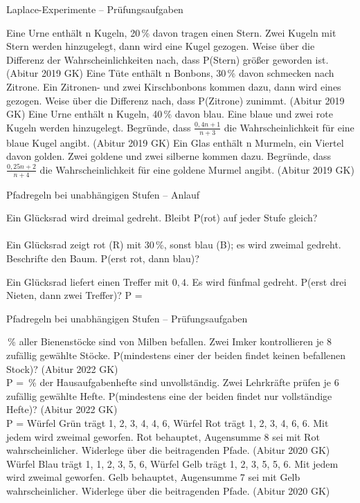 \begin{aufgabe}{Laplace-Experimente – Prüfungsaufgaben}
\begin{teile}
\teil Eine Urne enthält n Kugeln, 20\,\% davon tragen einen Stern. Zwei Kugeln mit Stern werden hinzugelegt, dann wird eine Kugel gezogen. Weise über die Differenz der Wahrscheinlichkeiten nach, dass P(Stern) größer geworden ist. \hfill (Abitur 2019 GK)
\teil Eine Tüte enthält n Bonbons, 30\,\% davon schmecken nach Zitrone. Ein Zitronen- und zwei Kirschbonbons kommen dazu, dann wird eines gezogen. Weise über die Differenz nach, dass P(Zitrone) zunimmt. \hfill (Abitur 2019 GK)
\teil Eine Urne enthält n Kugeln, 40\,\% davon blau. Eine blaue und zwei rote Kugeln werden hinzugelegt. Begründe, dass $\frac{0{,}4n + 1}{n + 3}$ die Wahrscheinlichkeit für eine blaue Kugel angibt. \hfill (Abitur 2019 GK)
\teil Ein Glas enthält n Murmeln, ein Viertel davon golden. Zwei goldene und zwei silberne kommen dazu. Begründe, dass $\frac{0{,}25n + 2}{n + 4}$ die Wahrscheinlichkeit für eine goldene Murmel angibt. \hfill (Abitur 2019 GK)
\end{teile}
\end{aufgabe}

\begin{aufgabe}{Pfadregeln bei unabhängigen Stufen – Anlauf}
\begin{teile}
\teil Ein Glücksrad wird dreimal gedreht. Bleibt P(rot) auf jeder Stufe gleich?\\ \\ 
\teil Ein Glücksrad zeigt rot (R) mit 30\,\%, sonst blau (B); es wird zweimal gedreht. Beschrifte den Baum. P(erst rot, dann blau)?

\teil Ein Glücksrad liefert einen Treffer mit $0{,}4$. Es wird fünfmal gedreht. P(erst drei Nieten, dann zwei Treffer)? P = \leerfeld
\end{teile}
\end{aufgabe}

\begin{aufgabe}{Pfadregeln bei unabhängigen Stufen – Prüfungsaufgaben}
\begin{teile}
\,\% aller Bienenstöcke sind von Milben befallen. Zwei Imker kontrollieren je 8 zufällig gewählte Stöcke. P(mindestens einer der beiden findet keinen befallenen Stock)? \hfill (Abitur 2022 GK) \\ P = \leerfeld
{}\,\% der Hausaufgabenhefte sind unvollständig. Zwei Lehrkräfte prüfen je 6 zufällig gewählte Hefte. P(mindestens eine der beiden findet nur vollständige Hefte)? \hfill (Abitur 2022 GK) \\ P = \leerfeld
\teil Würfel Grün trägt 1, 2, 3, 4, 4, 6, Würfel Rot trägt 1, 2, 3, 4, 6, 6. Mit jedem wird zweimal geworfen. Rot behauptet, Augensumme 8 sei mit Rot wahrscheinlicher. Widerlege über die beitragenden Pfade. \hfill (Abitur 2020 GK)
\teil Würfel Blau trägt 1, 1, 2, 3, 5, 6, Würfel Gelb trägt 1, 2, 3, 5, 5, 6. Mit jedem wird zweimal geworfen. Gelb behauptet, Augensumme 7 sei mit Gelb wahrscheinlicher. Widerlege über die beitragenden Pfade. \hfill (Abitur 2020 GK)
\end{teile}
\end{aufgabe}

